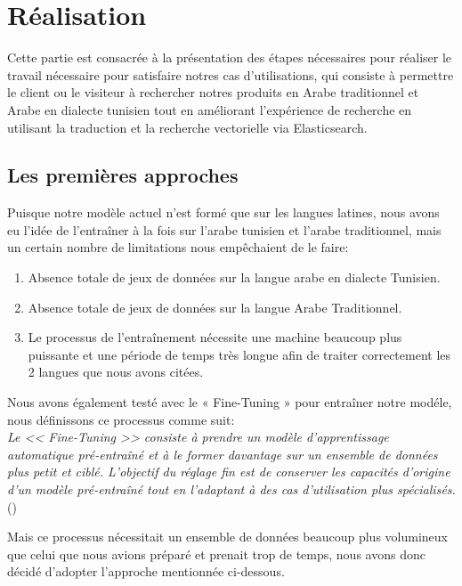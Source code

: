 \section{Réalisation}
\noindent
Cette partie est consacrée à la présentation des étapes nécessaires pour réaliser le travail nécessaire pour satisfaire notres cas d'utilisations, qui consiste à permettre le client ou le visiteur à rechercher notres produits en Arabe traditionnel et Arabe en dialecte tunisien tout en améliorant l'expérience de recherche en utilisant la traduction et la recherche vectorielle via Elasticsearch.

\subsection{Les premières approches}
\noindent
Puisque notre modèle actuel n'est formé que sur les langues latines, nous avons eu l'idée de l'entraîner à la fois sur l'arabe tunisien et l'arabe traditionnel, mais un certain nombre de limitations nous empêchaient de le faire:

\begin{enumerate}
	\item Absence totale de jeux de données sur la langue arabe en dialecte Tunisien.
	\item Absence totale de jeux de données sur la langue Arabe Traditionnel.
	\item Le processus de l'entraînement nécessite une machine beaucoup plus puissante et une période de temps très longue afin de traiter correctement les 2 langues que nous avons citées.
\end{enumerate}

\noindent
Nous avons également testé avec le « Fine-Tuning » pour entraîner notre modéle, nous définissons ce processus comme suit: \\
\textit{Le << Fine-Tuning >> consiste à prendre un modèle d'apprentissage automatique pré-entraîné et à le former davantage sur un ensemble de données plus petit et ciblé. L'objectif du réglage fin est de conserver les capacités d'origine d'un modèle pré-entraîné tout en l'adaptant à des cas d'utilisation plus spécialisés.} \\  (\cite{techtarget:finetuning})

\noindent
Mais ce processus nécessitait un ensemble de données beaucoup plus volumineux que celui que nous avions préparé et prenait trop de temps, nous avons donc décidé d'adopter l'approche mentionnée ci-dessous.

